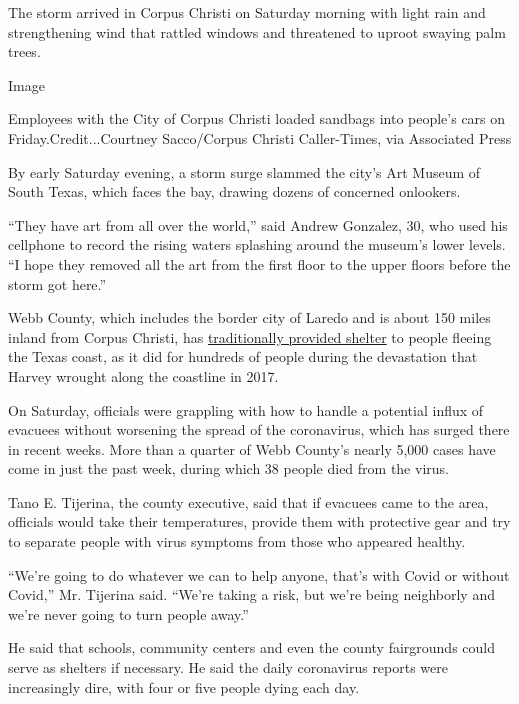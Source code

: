 The storm arrived in Corpus Christi on Saturday morning with light rain
and strengthening wind that rattled windows and threatened to uproot
swaying palm trees.

Image

Employees with the City of Corpus Christi loaded sandbags into people's
cars on Friday.Credit...Courtney Sacco/Corpus Christi Caller-Times, via
Associated Press

By early Saturday evening, a storm surge slammed the city's Art Museum
of South Texas, which faces the bay, drawing dozens of concerned
onlookers.

``They have art from all over the world,'' said Andrew Gonzalez, 30, who
used his cellphone to record the rising waters splashing around the
museum's lower levels. ``I hope they removed all the art from the first
floor to the upper floors before the storm got here.''

Webb County, which includes the border city of Laredo and is about 150
miles inland from Corpus Christi, has
\href{https://www.lmtonline.com/local/article/City-officials-About-150-Hurricane-Harvey-11960437.php}{traditionally
provided shelter} to people fleeing the Texas coast, as it did for
hundreds of people during the devastation that Harvey wrought along the
coastline in 2017.

On Saturday, officials were grappling with how to handle a potential
influx of evacuees without worsening the spread of the coronavirus,
which has surged there in recent weeks. More than a quarter of Webb
County's nearly 5,000 cases have come in just the past week, during
which 38 people died from the virus.

Tano E. Tijerina, the county executive, said that if evacuees came to
the area, officials would take their temperatures, provide them with
protective gear and try to separate people with virus symptoms from
those who appeared healthy.

``We're going to do whatever we can to help anyone, that's with Covid or
without Covid,'' Mr. Tijerina said. ``We're taking a risk, but we're
being neighborly and we're never going to turn people away.''

He said that schools, community centers and even the county fairgrounds
could serve as shelters if necessary. He said the daily coronavirus
reports were increasingly dire, with four or five people dying each day.

\href{https://www.nytimes3xbfgragh.onion/news-event/coronavirus?action=click\&pgtype=Article\&state=default\&module=styln-coronavirus-national\&region=MAIN_CONTENT_3\&context=storylines_faq}{}

